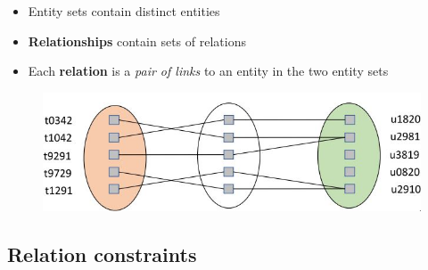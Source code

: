 \documentclass[conference]{IEEEtran}
\begin{document}
\begin{itemize}
    \item Entity sets contain distinct entities 
    \item \textbf{Relationships} contain sets of relations 
    \item Each \textbf{relation} is a \textit{pair of links} to an entity in the two entity sets
\end{itemize}
\begin{figure} [h!]
    \centering
    \includegraphics[scale=0.4]{Ex6.JPG}
\end{figure}

\subsection{Relation constraints}
\end{document}
